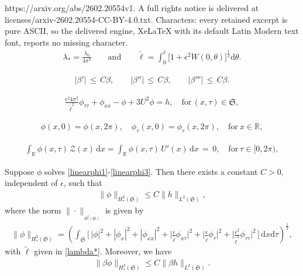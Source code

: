 \documentclass[10pt,a4paper]{amsart}
\begin{document}
https://arxiv.org/abs/2602.20554v1. A full rights notice is delivered at licenses/arxiv-2602.20554-CC-BY-4.0.txt. Characters: every retained excerpt is pure ASCII, so the delivered engine, XeLaTeX with its default Latin Modern text font, reports no missing character.
\begin{align}
\lambda_* = \frac{\lambda_0} {4\pi^2}
\qquad \text{and}\qquad
{\tilde\ell} = \int_0^{\ell} \big[1+ \epsilon^2 W(0, \theta)\big]^{\frac{1}{2}} {\mathrm d} \theta.
\label{lambda*}
\end{align}

\begin{align}
|\beta'|\,\leq\, C\beta,
\qquad
|\beta''|\,\leq\, C\beta,
\qquad
|\beta'''|\,\leq\, C\beta.
\label{beta-bound}
\end{align}

\begin{align} \label{linearphi1}
 \frac{\epsilon^2 4\pi^2}{{\tilde\ell}^2} \phi_{\tau\tau} + \phi_{xx} - \phi+3U^2 \phi = h,
\quad \text{for}\,(x, \tau)\in \mathfrak S,
\end{align}

\begin{align}
 \phi(x, 0) = \phi(x, 2\pi), \quad \phi_\tau(x, 0) = \phi_\tau(x, 2\pi), \quad \text{for}~x\in {\mathbb R},
\label{linearphi2}
\end{align}

\begin{align} \label{linearphi3}
 \int_{\mathbb R}\phi(x, \tau)\,\mathcal Z(x) \,{\mathrm d}x = \int_{\mathbb R}\phi(x, \tau)\,U'(x)\,{\mathrm d}x \,=\, 0, \quad \text{for}~\tau\in [0, 2\pi),
\end{align}

\begin{lemma}\label{linear lemma6-1}
 Suppose $\phi$ solves \eqref{linearphi1}-\eqref{linearphi3}. Then there exists a constant $C>0$, independent of $\epsilon$, such that
\begin{align} \label{norm h2 mathfrak S estimate}
 \|\phi\|_{H^2_*(\mathfrak S)} \leq C \|h\|_{L^2(\mathfrak S)},
\end{align}
where the  norm  $\|\cdot\|_{_{H^2_*(\mathfrak S)}}$ is given by
\begin{align} \label{norm h2 mathfrak S}
\|\phi\|_{H^2_*(\mathfrak S)}
= \left({\displaystyle\int}_{\mathfrak S} \Bigg[\, |\phi|^2+ |\phi_{x}|^2+ |\phi_{xx}|^2 +\Big|\frac{\epsilon}{\tilde\ell}\phi_{x\tau}\Big|^2
+ \Big|\frac{\epsilon}{\tilde\ell}\phi_{\tau}\Big|^2 + \Big|\frac{\epsilon^2}{\tilde\ell^2}\phi_{\tau\tau}\Big|^2 \, \Bigg] \,{\mathrm d}x {\mathrm d}\tau \right)^{\frac12},
\end{align}
with ${\tilde\ell}$ given in \eqref{lambda*}.
Moreover,
we have
\begin{align} \label{betanorm h2 mathfrak S estimate}
 \|\beta\phi\|_{H^2_*(\mathfrak S)} \leq C \|\beta h\|_{L^2(\mathfrak S)}.
\end{align}

\end{lemma}
\end{document}
